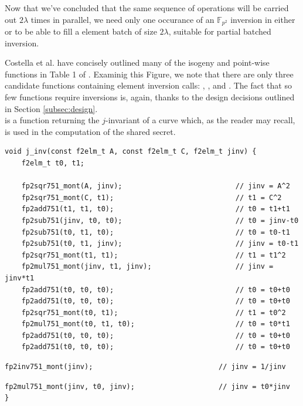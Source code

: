 Now that we've concluded that the same sequence of operations will be carried out $2\lambda$ times in parallel, we need only one occurance of an $\mathbb{F}_{p^2}$ inversion in either  or  to be able to fill a element batch of size $2\lambda$, suitable for partial batched inversion. 

Costella et al. have concisely outlined many of the \sidh isogeny and point-wise functions in Table 1 of \cite{effalg}. Examinig this Figure, we note that there are only three candidate functions containing element inversion calls: , , and . The fact that so few functions require inversions is, again, thanks to the design decisions outlined in Section \ref{subsec:design}.\\

\noindent
{} is a function returning the $j$-invariant of a curve which, as the reader may recall, is used in the computation of the shared secret.\\

\begin{lstlisting}
void j_inv(const f2elm_t A, const f2elm_t C, f2elm_t jinv) {
	f2elm_t t0, t1;

	fp2sqr751_mont(A, jinv);                           // jinv = A^2        
	fp2sqr751_mont(C, t1);                             // t1 = C^2
	fp2add751(t1, t1, t0);                             // t0 = t1+t1
	fp2sub751(jinv, t0, t0);                           // t0 = jinv-t0
	fp2sub751(t0, t1, t0);                             // t0 = t0-t1
	fp2sub751(t0, t1, jinv);                           // jinv = t0-t1
	fp2sqr751_mont(t1, t1);                            // t1 = t1^2
	fp2mul751_mont(jinv, t1, jinv);                    // jinv = jinv*t1
	fp2add751(t0, t0, t0);                             // t0 = t0+t0
	fp2add751(t0, t0, t0);                             // t0 = t0+t0
	fp2sqr751_mont(t0, t1);                            // t1 = t0^2
	fp2mul751_mont(t0, t1, t0);                        // t0 = t0*t1
	fp2add751(t0, t0, t0);                             // t0 = t0+t0
	fp2add751(t0, t0, t0);                             // t0 = t0+t0
\end{lstlisting}
\vspace{-\baselineskip}
\begin{lstlisting}[backgroundcolor=\color{light-red}, firstnumber=18]
	fp2inv751_mont(jinv);                              // jinv = 1/jinv
\end{lstlisting}
\vspace{-\baselineskip}
\begin{lstlisting}[firstnumber=19]
	fp2mul751_mont(jinv, t0, jinv);                    // jinv = t0*jinv
}
\end{lstlisting}

